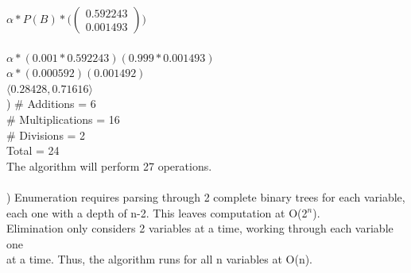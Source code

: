 \documentclass[12pt]{article}
\begin{document}
\indent $\alpha * P(B) *\Big(\begin{pmatrix}0.592243 \\ 0.001493 \end{pmatrix}\Big)$\\\\
\indent $\alpha * (0.001 * 0.592243)(0.999 * 0.001493)$\\[0.4em]
\indent $\alpha * (0.000592)(0.001492)$\\[0.4em]
\indent $\langle0.28428, 0.71616\rangle$\\[0.4em]


) \# Additions = 6\\
\indent \# Multiplications = 16\\
\indent \# Divisions = 2\\
\indent Total = 24\\[.4em]
\indent The algorithm will perform 27 operations.\\\\


) Enumeration requires parsing through 2 complete binary trees for each variable, \\
\indent each one with a depth of n-2. This leaves computation at O(2$^n$).\\
\indent Elimination only considers 2 variables at a time, working through each variable one\\
\indent at a time. Thus, the algorithm runs for all n variables at O(n).\\
\end{document}
